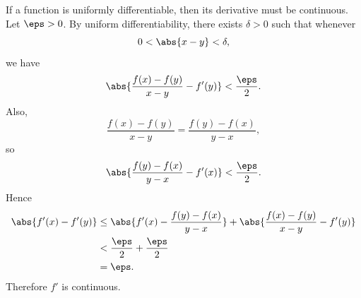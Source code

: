 \begin{problem}[Exercise 6.2.4]{
    If a function is uniformly differentiable, then its derivative must be continuous.
}
    Let $\eps > 0$.
    By uniform differentiability, there exists $\delta > 0$ such that whenever
    \[
        0<\abs{x-y}<\delta,
    \]
    we have
    \[
        \abs{\frac{f(x)-f(y)}{x-y}-f'(y)}<\frac{\eps}{2}.
    \]
    Also,
    \[
        \frac{f(x)-f(y)}{x-y}
        =
        \frac{f(y)-f(x)}{y-x},
    \]
    so
    \[
        \abs{\frac{f(y)-f(x)}{y-x}-f'(x)}<\frac{\eps}{2}.
    \]
    Hence
    \begin{align*}
        \abs{f'(x)-f'(y)}
        &\leq
        \abs{f'(x)-\frac{f(y)-f(x)}{y-x}}
        +
        \abs{\frac{f(x)-f(y)}{x-y}-f'(y)}\\
        &<\frac{\eps}{2}+\frac{\eps}{2}\\
        &=\eps.
    \end{align*}
    Therefore $f'$ is continuous.
\end{problem}

